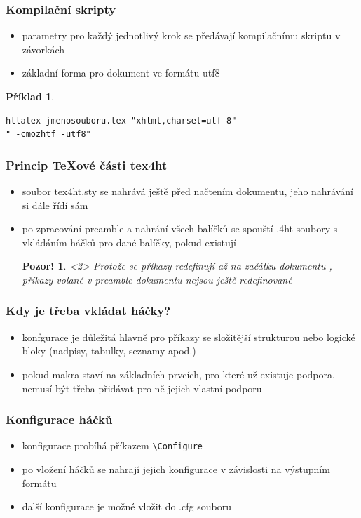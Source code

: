 \documentclass[czech]{beamer}
\newtheorem{priklad}{Příklad}
\newtheorem{pozor}{Pozor!}
\begin{document}
\begin{frame}[fragile]
  \frametitle{Kompilační skripty}
  \begin{itemize}
    \item parametry pro každý jednotlivý krok se předávají kompilačnímu skriptu v závorkách
    \item základní forma pro dokument ve formátu utf8
  \end{itemize}
      \begin{priklad}
        \small 
\begin{verbatim}
htlatex jmenosouboru.tex "xhtml,charset=utf-8" 
" -cmozhtf -utf8"
\end{verbatim}
     \end{priklad}
\end{frame}
\begin{frame}
  \frametitle{Princip TeXové části tex4ht}
  \begin{itemize}
    \item soubor tex4ht.sty se nahrává ještě před načtením dokumentu, jeho
      nahrávání si dále řídí sám
  \item po zpracování preamble a nahrání všech balíčků se spouští .4ht soubory
    s vkládáním háčků pro dané balíčky, pokud existují
    \begin{pozor}<2>
      Protože se příkazy redefinují až na začátku dokumentu , příkazy
      volané v preamble dokumentu nejsou ještě redefinované
    \end{pozor}
\end{itemize}
\end{frame}
\begin{frame}
  \frametitle{Kdy je třeba vkládat háčky?}
  \begin{itemize}
\item konfgurace je důležitá hlavně pro příkazy se složitější strukturou nebo
      logické bloky (nadpisy, tabulky, seznamy apod.)
    \item  pokud makra staví na základních prvcích, pro které už existuje
      podpora, nemusí být třeba přidávat pro ně jejich vlastní podporu
  \end{itemize}
\end{frame}
\begin{frame}
  \frametitle{Konfigurace háčků}
  \begin{itemize}
    \item konfigurace probíhá příkazem \texttt{\textbackslash Configure}

    \item po vložení háčků se nahrají jejich konfigurace v závislosti na
      výstupním formátu
  \item další konfigurace je možné vložit do .cfg souboru
\end{itemize}
\end{frame}
\end{document}
